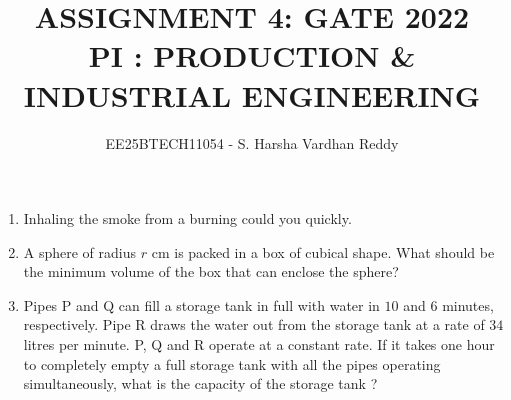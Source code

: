\documentclass[journal,12pt,onecolumn]{IEEEtran}
\theoremstyle{remark}
\begin{document}
\title{
ASSIGNMENT 4: GATE 2022 \\
PI : PRODUCTION \& INDUSTRIAL ENGINEERING}
\author{EE25BTECH11054 - S. Harsha Vardhan Reddy}
\maketitle
\renewcommand{\thefigure}{\theenumi}
\renewcommand{\thetable}{\theenumi}

\begin{enumerate}
    \item Inhaling the smoke from a burning \underline{\hspace{2cm}} could \underline{\hspace{2cm}} you quickly.

    \hfill{}
    \begin{enumerate}
    \end{enumerate}

    \item A sphere of radius $r$ cm is packed in a box of cubical shape. What should be the minimum volume  of the box that can enclose the sphere?

    \hfill{}
    \begin{enumerate}
    \end{enumerate}

    \item Pipes P and Q can fill a storage tank in full with water in $10$ and $6$ minutes, respectively. Pipe R draws the water out from the storage tank at a rate of $34$ litres per minute. P, Q and R operate at a constant rate. If it takes one hour to completely empty a full storage tank with all the pipes operating simultaneously, what is the capacity of the storage tank ?


\end{enumerate}
\end{document}
